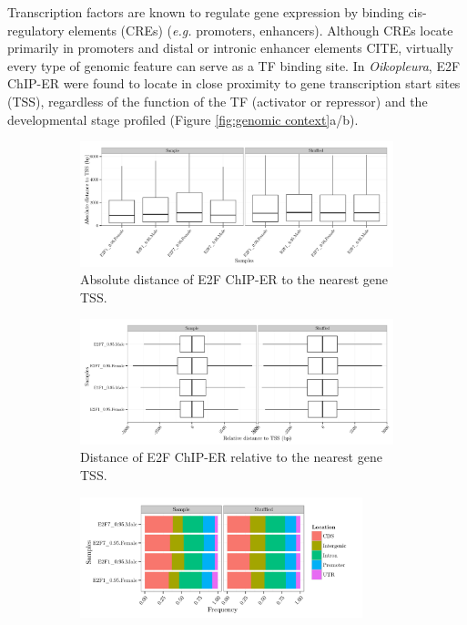 \documentclass[11pt,twoside,a4paper]{report}
\begin{document}
		Transcription factors are known to regulate gene expression by binding cis-regulatory elements (CREs) (\textit{e.g.} promoters, enhancers). Although CREs locate primarily in promoters and distal or intronic enhancer elements CITE, virtually every type of genomic feature can serve as a TF binding site. In \textit{Oikopleura}, E2F ChIP-ER were found to locate in close proximity to gene transcription start sites (TSS), regardless of the function of the TF (activator or repressor) and the developmental stage profiled (Figure \ref{fig:genomic context}a/b). 
				
		\begin{figure}
			\setlength{\belowcaptionskip}{5pt}
			\centering
			\begin{subfigure}[b]{1\textwidth}
				\centering
				\includegraphics[width=1\linewidth]{pngs/E2F_distanceTSS_abs.png}
				\caption{Absolute distance of E2F ChIP-ER to the nearest gene TSS.}
			\end{subfigure}
			\begin{subfigure}[b]{1\textwidth}
				\centering
				\includegraphics[width=1\linewidth]{pngs/E2F_distanceTSS_rel.png}
				\caption{Distance of E2F ChIP-ER relative to the nearest gene TSS.}
			\end{subfigure}
			\begin{subfigure}[b]{1\textwidth}			
				\centering
				\includegraphics[width=0.9\textwidth]{pngs/E2F_genomicLocation.png}

\end{subfigure}
\end{figure}
\end{document}
